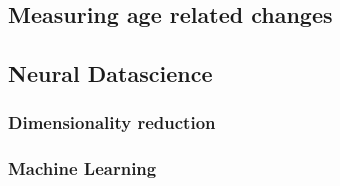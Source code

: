 \subsection{Measuring age related changes}
\subsection{Neural Datascience}
\subsubsection{Dimensionality reduction}
\subsubsection{Machine Learning}
